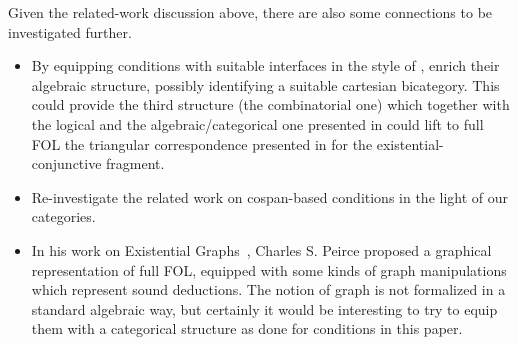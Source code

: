 %
Given the related-work discussion above, there are also some connections to be investigated further.
%
\begin{itemize}
\item By equipping conditions with suitable interfaces in the style of \cite{Bonchi}, enrich their algebraic structure, possibly identifying a suitable cartesian bicategory. This could provide the third structure (the combinatorial one) which together with the logical and the algebraic/categorical one presented in \cite{DBLP:journals/corr/abs-2404-18795} could lift to full FOL the triangular correspondence presented in \cite{DBLP:conf/csl/BonchiSS18} for the existential-conjunctive fragment.
\item Re-investigate the related work on cospan-based conditions in the light of our categories.
\item In his work on Existential Graphs~\cite{roberts1973-the-existential-graphs-of-charles-s.-peirce}, Charles S. Peirce proposed a graphical representation of full FOL, equipped with some kinds of graph manipulations which represent sound deductions. The notion of graph is not formalized in a standard algebraic way, but certainly it would be interesting to try to equip them with a categorical structure as done for conditions in this paper.  
\end{itemize}
